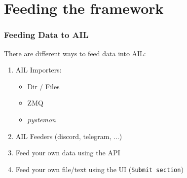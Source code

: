 \documentclass{beamer}
\begin{document}
\section{Feeding the framework}

\begin{frame}
\frametitle{Feeding Data to AIL}
    There are different ways to feed data into AIL:
    \begin{enumerate}
        \item AIL Importers:
            \begin{itemize}
                \item Dir / Files
                \item ZMQ
                \item \textit{pystemon}
            \end{itemize}
        \item AIL Feeders (discord, telegram, ...)
        \item Feed your own data using the API
        \item Feed your own file/text using the UI (\texttt{Submit section})
    \end{enumerate}
\end{frame}
\end{document}
